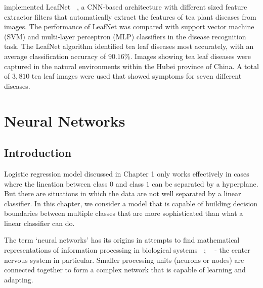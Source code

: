 \documentclass[12pt]{report}
\numberwithin{equation}{section}
\begin{document}
\textbf{\cite{chen2019visual}} implemented LeafNet \textbf{~\cite{barre2017leafnet}}, a CNN-based architecture with different sized feature extractor filters that automatically extract the features of tea plant diseases from images. The performance of LeafNet was compared with support vector machine (SVM) and multi-layer perceptron (MLP) classifiers in the disease recognition task. The LeafNet algorithm identified tea leaf diseases most accurately, with an average classification accuracy of $90.16\%$. Images showing tea leaf diseases were captured  in the natural environments  within the Hubei province of China. A total of $3,810$ tea leaf images were used that showed symptoms for seven different diseases. 









\chapter{Neural Networks}
\setcounter{section}{-1}
\section{Introduction}
Logistic regression model discussed in Chapter 1 only works effectively in cases where the lineation between class $0$ and class $1$ can be separated by a hyperplane. But there are situations in which the data are not well separated by a linear classifier. In this chapter, we consider a model that is capable of building decision boundaries between multiple classes that are more sophisticated than what a linear classifier can do. %

The term `neural networks' has its origins in attempts to find mathematical representations of information processing in biological systems \textbf{~\cite{McCulloch1943}}; \textbf{~\cite{Rosenblatt58theperceptron}} - the center nervous system in particular. Smaller processing units (neurons or nodes) are connected together to form a complex network that is capable of learning and adapting. %
\end{document}
